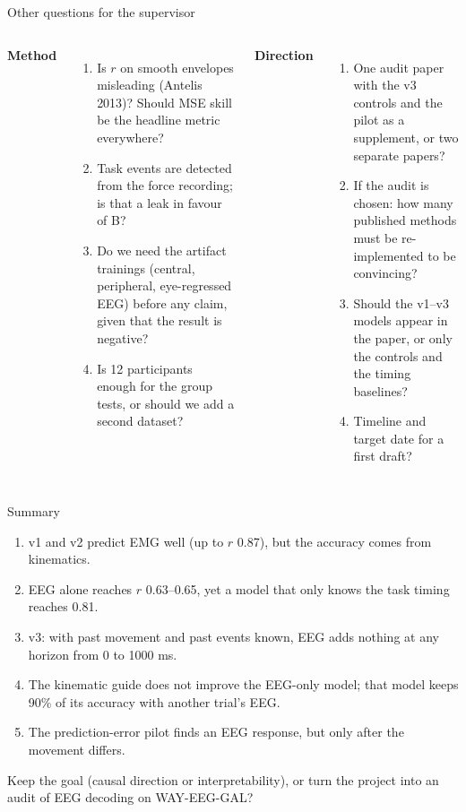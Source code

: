 \documentclass[aspectratio=169,10pt]{beamer}
\begin{document}
\begin{frame}{Other questions for the supervisor}
  \begin{columns}[T]
    \textbf{Method}
    \begin{enumerate}\scriptsize
      \item Is $r$ on smooth envelopes misleading (Antelis 2013)? Should MSE skill be the headline metric everywhere?
      \item Task events are detected from the force recording; is that a leak in favour of B?
      \item Do we need the artifact trainings (central, peripheral, eye-regressed EEG) before any claim, given that the
            result is negative?
      \item Is 12 participants enough for the group tests, or should we add a second dataset?
    \end{enumerate}
    \textbf{Direction}
    \begin{enumerate}\scriptsize\setcounter{enumi}{4}
      \item One audit paper with the v3 controls and the pilot as a supplement, or two separate papers?
      \item If the audit is chosen: how many published methods must be re-implemented to be convincing?
      \item Should the v1--v3 models appear in the paper, or only the controls and the timing baselines?
      \item Timeline and target date for a first draft?
    \end{enumerate}
  \end{columns}
\end{frame}

\begin{frame}{Summary}
  \begin{enumerate}\small
    \item v1 and v2 predict EMG well (up to $r$ 0.87), but the accuracy comes from kinematics.
    \item EEG alone reaches $r$ 0.63--0.65, yet a model that only knows the task timing reaches 0.81.
    \item v3: with past movement and past events known, EEG adds nothing at any horizon from 0 to 1000 ms.
    \item The kinematic guide does not improve the EEG-only model; that model keeps 90\% of its accuracy with
          another trial's EEG.
    \item The prediction-error pilot finds an EEG response, but only after the movement differs.
  \end{enumerate}
  \begin{tcolorbox}[askbox,title={Decision needed}]
    \small Keep the goal (causal direction or interpretability), or turn the project into an audit of EEG decoding on
    WAY-EEG-GAL?
  \end{tcolorbox}
\end{frame}
\end{document}
